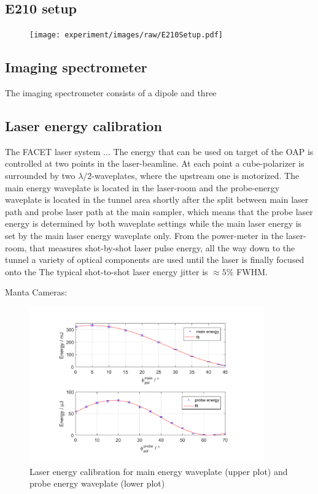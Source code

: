 \subsection{E210 setup}
\begin{figure}[htbp]
\texttt{[image: experiment/images/raw/E210Setup.pdf]}
\caption{}
\label{img:LaserEnergyCalib}
\end{figure}


\subsection{Imaging spectrometer}
The imaging spectrometer consists of a dipole and three 
\subsection{Laser energy calibration}
The FACET laser system ...
The energy that can be used on target of the OAP is controlled at two points in the laser-beamline.
At each point a cube-polarizer is surrounded by two  $\lambda/2$-waveplates, where the upstream one is motorized.
The main energy waveplate is located in the laser-room and the probe-energy waveplate is located in the tunnel area shortly after the split between main laser path and probe laser path at the main sampler, which means that the probe laser energy is determined by both waveplate settings while the main laser energy is set by the main laser energy waveplate only. From the power-meter in the laser-room, that measures shot-by-shot laser pulse energy, all the way down to the tunnel a variety of optical components are used until the laser is finally focused onto the 
The typical shot-to-shot laser energy jitter  is $\approx 5 \%$ FWHM.

Manta Cameras: \cite{GigE125_datasheet}

\begin{figure}[htbp]
\includegraphics[width=0.9\textwidth]{experiment/images/edited/waveplate_calibration.pdf}
\caption{Laser energy calibration for main energy waveplate (upper plot) and probe energy waveplate (lower plot)}
\label{img:LaserEnergyCalib}
\end{figure}

